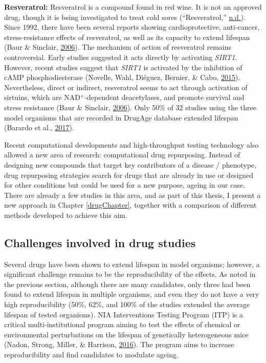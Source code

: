 \documentclass[12pt,twoside]{unicam}
\begin{document}
\textbf{Resveratrol:} Resveratrol is a compound found in red wine. It is not an approved drug, though it is being investigated to treat cold sores (``Resveratrol,'' \protect\hyperlink{ref-Resveratrol}{n.d.}). Since 1992, there have been several reports showing cardioprotective, anti-cancer, stress-resistance effects of resveratrol, as well as its capacity to extend lifespan (Baur \& Sinclair, \protect\hyperlink{ref-Baur2006}{2006}). The mechanism of action of resveratrol remains controversial. Early studies suggested it acts directly by activating \emph{SIRT1}. However, recent studies suggest that \emph{SIRT1} is activated by the inhibition of cAMP phosphodiesterase (Novelle, Wahl, Diéguez, Bernier, \& Cabo, \protect\hyperlink{ref-Novelle2015}{2015}). Nevertheless, direct or indirect, resveratrol seems to act through activation of sirtuins, which are NAD\(^+\)-dependent deacetylases, and promote survival and stress resistance (Baur \& Sinclair, \protect\hyperlink{ref-Baur2006}{2006}). Only 50\% of 32 studies using the three model organisms that are recorded in DrugAge database extended lifespan (Barardo et al., \protect\hyperlink{ref-Barardo2017}{2017}).

Recent computational developments and high-throughput testing technology also allowed a new area of research: computational drug repurposing. Instead of designing new compounds that target key contributors of a disease / phenotype, drug repurposing strategies search for drugs that are already in use or designed for other conditions but could be used for a new purpose, ageing in our case. There are already a few studies in this area, and as part of this thesis, I present a new approach in Chapter \ref{drugChapter}, together with a comparison of different methods developed to achieve this aim.

\hypertarget{challenges-involved-in-drug-studies}{%
\subsection{Challenges involved in drug studies}\label{challenges-involved-in-drug-studies}}

Several drugs have been shown to extend lifespan in model organisms; however, a significant challenge remains to be the reproducibility of the effects. As noted in the previous section, although there are many candidates, only three had been found to extend lifespan in multiple organisms, and even they do not have a very high reproducibility (50\%, 62\%, and 100\% of the studies extended the average lifespan of tested organisms). NIA Interventions Testing Program (ITP) is a critical multi-institutional program aiming to test the effects of chemical or environmental perturbations on the lifespan of genetically heterogeneous mice (Nadon, Strong, Miller, \& Harrison, \protect\hyperlink{ref-Nadon2016}{2016}). The program aims to increase reproducibility and find candidates to modulate ageing.
\end{document}
